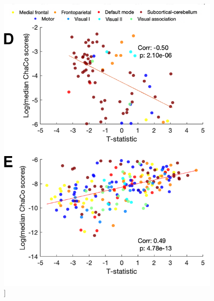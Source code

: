 \documentclass[phd,tocprelim]{cornell}
\renewcommand{\caption}[1]{\singlespacing\hangcaption{#1}\normalspacing}
\begin{document}
\null
\vfill
\clearpage
\null
\vfill
\begin{figure}[h!]
		\ContinuedFloat
		\captionsetup{labelformat=adja-page}
    \centering
    \includegraphics[width=\textwidth]{chapter1/Figure4DE.png}
    \caption[]{}
\end{figure}
\null
\vfill
\clearpage

    
    
    
\end{document}
